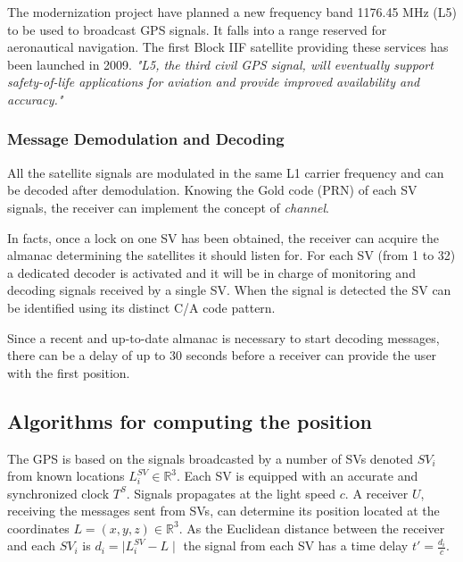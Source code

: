 \documentclass[PhD,binding=0.6cm]{dithesis}
\begin{document}
The modernization project have planned a new frequency band 1176.45 MHz (L5) to be used to broadcast GPS signals. It falls into a range reserved for aeronautical navigation. The first Block IIF satellite providing these services has been launched in 2009. \emph{"L5, the third civil GPS signal, will eventually support safety-of-life applications for aviation and provide improved availability and accuracy."} \cite{web:L5}

\subsubsection{Message Demodulation and Decoding}

All the satellite signals are modulated in the same L1 carrier frequency and can be decoded after demodulation. Knowing the Gold code (PRN) of each SV signals, the receiver can implement the concept of \emph{channel}.

In facts, once a lock on one SV has been obtained, the receiver can acquire the almanac determining the satellites it should listen for. For each SV (from 1 to 32) a dedicated decoder is activated and it will be in charge of monitoring and decoding signals received by a single SV. When the signal is detected the SV can be identified using its distinct C/A code pattern.

Since a recent and up-to-date almanac is necessary to start decoding messages, there can be a delay of up to 30 seconds before a receiver can provide the user with the first position.



\subsection{Algorithms for computing the position}

The GPS is based on the signals broadcasted by a number of SVs denoted $SV_i$ from known locations $ L_i^{SV}  \in \mathbb{R}^3 $.
Each SV is equipped  with an accurate and synchronized clock  $ T^S $. Signals propagates at the light speed $ c $.
A receiver $ U $, receiving the messages sent from SVs, can determine its position located at the coordinates $ L = (x, y, z)  \in \mathbb{R}^3 $. As the Euclidean  distance between the receiver and each $SV_i$ is $ d_i = \mid L_i^{SV} - L \mid $ the signal from each SV has a time delay $ t' = \frac{d_i} { c } $.
\end{document}
